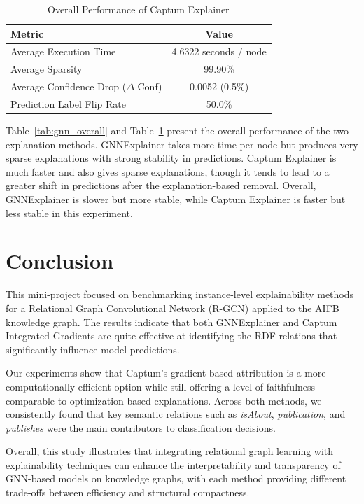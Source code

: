 \documentclass[runningheads]{llncs}
\begin{document}
\begin{table}[ht]
\centering
\caption{Overall Performance of Captum Explainer}
\label{tab:captum_overall}
\begin{tabular}{lc}
\hline
\textbf{Metric} & \textbf{Value} \\
\hline
Average Execution Time & 4.6322 seconds / node \\
Average Sparsity & 99.90\% \\
Average Confidence Drop ($\Delta$ Conf) & 0.0052 (0.5\%) \\
Prediction Label Flip Rate & 50.0\% \\
\hline
\end{tabular}
\end{table}

Table~\ref{tab:gnn_overall} and Table~\ref{tab:captum_overall} present the overall performance of the two explanation methods. GNNExplainer takes more time per node but produces very sparse explanations with strong stability in predictions. Captum Explainer is much faster and also gives sparse explanations, though it tends to lead to a greater shift in predictions after the explanation-based removal. Overall, GNNExplainer is slower but more stable, while Captum Explainer is faster but less stable in this experiment.

\section{Conclusion}

This mini-project focused on benchmarking instance-level explainability methods for a Relational Graph Convolutional Network (R-GCN) applied to the AIFB knowledge graph. The results indicate that both GNNExplainer and Captum Integrated Gradients are quite effective at identifying the RDF relations that significantly influence model predictions.

Our experiments show that Captum's gradient-based attribution is a more computationally efficient option while still offering a level of faithfulness comparable to optimization-based explanations. Across both methods, we consistently found that key semantic relations such as \textit{isAbout}, \textit{publication}, and \textit{publishes} were the main contributors to classification decisions.

Overall, this study illustrates that integrating relational graph learning with explainability techniques can enhance the interpretability and transparency of GNN-based models on knowledge graphs, with each method providing different trade-offs between efficiency and structural compactness.
\end{document}
